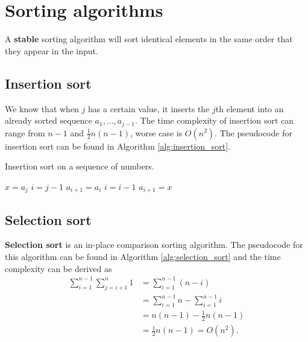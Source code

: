 \chapter{Sorting algorithms}

\begin{definition}
    A \textbf{stable} sorting algorithm will sort identical elements in the same order that they appear in the input.
\end{definition}

\section{Insertion sort}

\begin{definition}
    We know that when $j$ has a certain value, it inserts the $j$th element into an already sorted sequence $a_1,\ldots,a_{j-1}$. The time complexity of insertion sort can range from $n-1$ and $\frac12n(n-1)$, worse case is $O(n^2)$. The pseudocode for insertion sort can be found in Algorithm \ref{alg:insertion_sort}.
\end{definition}


\begin{algorithm}
    \caption{Insertion sort on a sequence of numbers.}
    \label{alg:insertion_sort}
    \begin{algorithmic}[1]
                \State $x=a_j$
                \State $i=j-1$
                    \State $a_{i+1}=a_{i}$
                    \State $i=i-1$
                \EndWhile
                \State $a_{i+1}=x$
            \EndFor
        \EndProcedure
    \end{algorithmic}
\end{algorithm}


\section{Selection sort}

\begin{definition}
    \textbf{Selection sort} is an in-place comparison sorting algorithm. The pseudocode for this algorithm can be found in Algorithm \ref{alg:selection_sort} and the time complexity can be derived as
    \begin{align*}
        \sum_{i=1}^{n-1}\sum_{j=i+1}^n{1}&=\sum_{i=1}^{n-1}{(n-i)}\\
        &=\sum_{i=1}^{n-1}{n}-\sum_{i=1}^{n-1}{i}\\
        &=n(n-1)-\frac12n(n-1)\\
        &=\frac12n(n-1)=O(n^2).
    \end{align*}
\end{definition}

